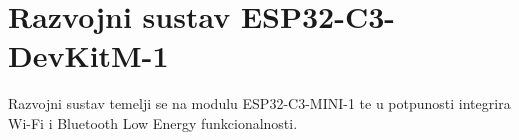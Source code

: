 \chapter{Razvojni sustav ESP32-C3-DevKitM-1}

Razvojni sustav temelji se na modulu ESP32-C3-MINI-1 te u potpunosti integrira Wi-Fi i Bluetooth Low Energy funkcionalnosti. 

\eject